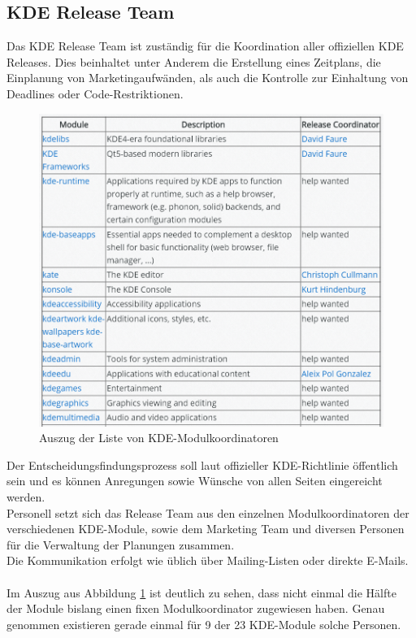 \subsection{KDE Release Team \cite{KDEReleaseTeam}}
Das KDE Release Team ist zuständig für die Koordination aller offiziellen KDE Releases. Dies beinhaltet unter Anderem die Erstellung eines Zeitplans, die Einplanung von Marketingaufwänden, als auch die Kontrolle zur Einhaltung von Deadlines oder Code-Restriktionen.\\
\begin{figure}[h]
	\centering
	\includegraphics[width=\columnwidth]{images/KDE_module_coordinators.png}
	\caption{Auszug der Liste von KDE-Modulkoordinatoren \cite{KDEReleaseTeam}}
	\label{fig:kde_moduleKoord}
\end{figure}
Der Entscheidungsfindungsprozess soll laut offizieller KDE-Richtlinie öffentlich sein und es können Anregungen sowie Wünsche von allen Seiten eingereicht werden.\\
Personell setzt sich das Release Team aus den einzelnen Modulkoordinatoren der verschiedenen KDE-Module, sowie dem Marketing Team und diversen Personen für die Verwaltung der Planungen zusammen.\\
Die Kommunikation erfolgt wie üblich über Mailing-Listen oder direkte E-Mails. \cite{KDEReleaseTeam} \\ \\
Im Auszug aus Abbildung \ref{fig:kde_moduleKoord} ist deutlich zu sehen, dass nicht einmal die Hälfte der Module bislang einen fixen Modulkoordinator zugewiesen haben. Genau genommen existieren gerade einmal für 9 der 23 KDE-Module solche Personen.\\

